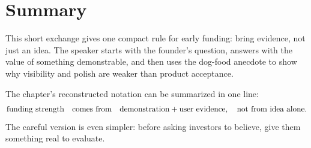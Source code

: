 \section{Summary}

This short exchange gives one compact rule for early funding: bring evidence, not just an idea. The speaker starts with the founder's question, answers with the value of something demonstrable, and then uses the dog-food anecdote to show why visibility and polish are weaker than product acceptance.

The chapter's reconstructed notation can be summarized in one line:
\begin{equation}
\text{funding strength}
\quad\hbox{comes from}\quad
\text{demonstration}+\text{user evidence},
\quad\hbox{not from idea alone.}
\end{equation}
The careful version is even simpler: before asking investors to believe, give them something real to evaluate.